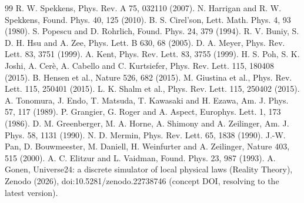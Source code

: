 \documentclass[11pt]{article}
\theoremstyle{definition}
\begin{document}
\begin{thebibliography}{99}
 R. W. Spekkens, Phys. Rev. A 75, 032110 (2007).
 N. Harrigan and R. W. Spekkens, Found. Phys. 40, 125 (2010).
 B. S. Cirel'son, Lett. Math. Phys. 4, 93 (1980).
 S. Popescu and D. Rohrlich, Found. Phys. 24, 379 (1994).
 R. V. Buniy, S. D. H. Hsu and A. Zee, Phys. Lett. B 630, 68 (2005).
 D. A. Meyer, Phys. Rev. Lett. 83, 3751 (1999).
 A. Kent, Phys. Rev. Lett. 83, 3755 (1999).
 H. S. Poh, S. K. Joshi, A. Cer\`e, A. Cabello and C. Kurtsiefer, Phys. Rev. Lett. 115, 180408 (2015).
 B. Hensen et al., Nature 526, 682 (2015).
 M. Giustina et al., Phys. Rev. Lett. 115, 250401 (2015).
 L. K. Shalm et al., Phys. Rev. Lett. 115, 250402 (2015).
 A. Tonomura, J. Endo, T. Matsuda, T. Kawasaki and H. Ezawa, Am. J. Phys. 57, 117 (1989).
 P. Grangier, G. Roger and A. Aspect, Europhys. Lett. 1, 173 (1986).
 D. M. Greenberger, M. A. Horne, A. Shimony and A. Zeilinger, Am. J. Phys. 58, 1131 (1990).
 N. D. Mermin, Phys. Rev. Lett. 65, 1838 (1990).
 J.-W. Pan, D. Bouwmeester, M. Daniell, H. Weinfurter and A. Zeilinger, Nature 403, 515 (2000).
 A. C. Elitzur and L. Vaidman, Found. Phys. 23, 987 (1993).
 A. Gonen, Universe24: a discrete simulator of local physical laws (Reality Theory), Zenodo (2026), doi:10.5281/zenodo.22738746 (concept DOI, resolving to the latest version).
\end{thebibliography}
\end{document}
